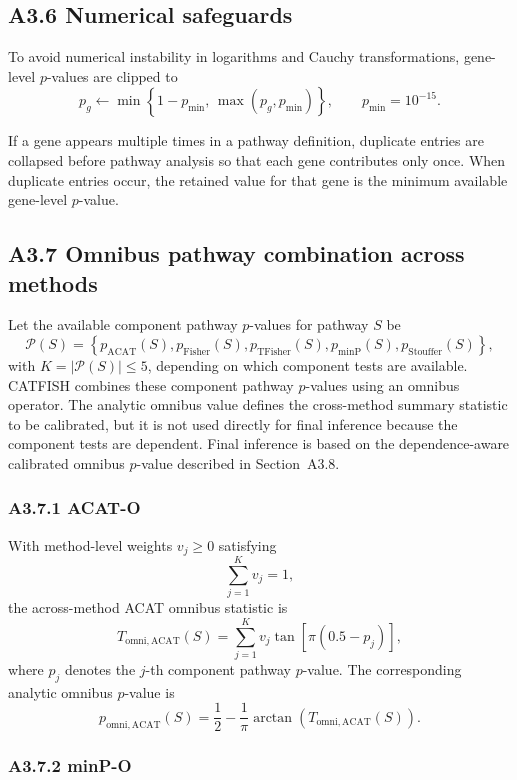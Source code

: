 \documentclass[unnumsec,webpdf,contemporary,large]{oup-authoring-template}%
\theoremstyle{thmstyleone}%
\theoremstyle{thmstyletwo}%
\theoremstyle{thmstylethree}%
\begin{document}
\begin{appendices}
\subsection{A3.6 Numerical safeguards}

To avoid numerical instability in logarithms and Cauchy transformations, gene-level $p$-values are clipped to
\[
p_g
\leftarrow
\min\left\{1-p_{\min},\,\max\left(p_g,p_{\min}\right)\right\},
\qquad
p_{\min}=10^{-15}.
\]

If a gene appears multiple times in a pathway definition, duplicate entries are collapsed before pathway analysis so that each gene contributes only once. When duplicate entries occur, the retained value for that gene is the minimum available gene-level $p$-value.

\subsection{A3.7 Omnibus pathway combination across methods}

Let the available component pathway $p$-values for pathway $S$ be
\[
\mathcal{P}(S)
=
\left\{
p_{\mathrm{ACAT}}(S),
p_{\mathrm{Fisher}}(S),
p_{\mathrm{TFisher}}(S),
p_{\mathrm{minP}}(S),
p_{\mathrm{Stouffer}}(S)
\right\},
\]
with $K=|\mathcal{P}(S)|\le 5$, depending on which component tests are available. CATFISH combines these component pathway $p$-values using an omnibus operator. The analytic omnibus value defines the cross-method summary statistic to be calibrated, but it is not used directly for final inference because the component tests are dependent. Final inference is based on the dependence-aware calibrated omnibus $p$-value described in Section~A3.8.

\subsubsection{A3.7.1 ACAT-O}

With method-level weights $v_j\ge 0$ satisfying
\[
\sum_{j=1}^{K}v_j=1,
\]
the across-method ACAT omnibus statistic is
\[
T_{\mathrm{omni,ACAT}}(S)
=
\sum_{j=1}^{K}
v_j
\tan\!\left[\pi\left(0.5-p_j\right)\right],
\]
where $p_j$ denotes the $j$-th component pathway $p$-value. The corresponding analytic omnibus $p$-value is
\[
p_{\mathrm{omni,ACAT}}(S)
=
\frac{1}{2}
-
\frac{1}{\pi}
\arctan\!\left(T_{\mathrm{omni,ACAT}}(S)\right).
\]

\subsubsection{A3.7.2 minP-O}


\end{appendices}
\end{document}
